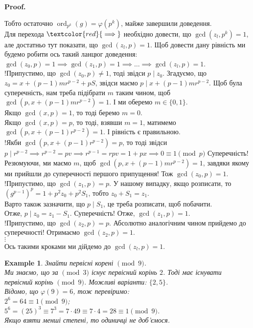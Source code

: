 \documentclass[a4paper, 14pt]{extarticle}
\makeatletter
\theoremstyle{theoremdd}
\theoremstyle{theoremdd}
\theoremstyle{theoremdd}
\theoremstyle{theoremdd}
\newtheorem{example}[theorem]{Example}
\theoremstyle{theoremdd}
\theoremstyle{theoremdd}
\theoremstyle{theoremdd}
\theoremstyle{theoremdd}
\def\qed{$\blacksquare$}
\renewenvironment{proof}[1][Proof.\\]{\par
\pushQED{\hfill \qed}%
\normalfont \topsep6\p@\@plus6\p@\relax
\trivlist
\item\relax
{\bfseries
#1\@addpunct{.}}\hspace\labelsep\ignorespaces
}{%
\popQED\endtrivlist\@endpefalse
}
\DeclareMathOperator{\ord}{ord}
\makeatother
\begin{document}
\begin{proof}
Тобто остаточно $\ord_{p^k} (g) = \varphi(p^k)$, майже завершили доведення.
\bigskip \\
Для перехода $\textcolor{red}{\implies}$ необхідно довести, що $\gcd(z_l,p^k) = 1$, але достатньо тут показати, що $\gcd(z_l,p) = 1$. Щоб довести дану рівність ми будемо робити ось такий ланцюг доведення:\\
$\gcd(z_0,p) = 1 \implies \gcd(z_1,p) = 1 \implies \dots \implies \gcd(z_l,p)=1$.\\
!Припустимо, що $\gcd(z_0,p) \neq 1$, тоді звідси $p \mid z_0$. Згадуємо, що\\
$z_0 = x + (p-1)mr^{p-2} + pS$, звідси маємо $p \mid x+(p-1)mr^{p-2}$. Щоб була суперечність, нам треба підібрати $m$ таким чином, щоб \\ $\gcd(p,x+(p-1)mr^{p-2}) = 1$. І ми оберемо $m \in \{0,1\}$.\\
Якщо $\gcd(x,p) = 1$, то тоді беремо $m = 0$.\\
Якщо $\gcd(x,p) = p$, то тоді, взявши $m =1$, матимемо \\ $\gcd(p,x+(p-1)r^{p-2}) = 1$. І рівність є правильною. \\
!Якби $\gcd(p,x+(p-1)r^{p-2}) = p$, то тоді звідси $p \mid r^{p-2} \implies r^{p-2} = pv \implies r^{p-1} = rpv = 1 + px \implies 0 \equiv 1 \pmod p$ Суперечність!\\
Резюмуючи, ми маємо $m$, щоб $\gcd(p,x+(p-1)mr^{p-2}) = 1$, завдяки якому ми прийшли до суперечності першого припущення! Тож $\gcd(z_0,p) = 1$.
\bigskip \\
!Припустимо, що $\gcd(z_1,p) = p$. У нашому випадку, якщо розписати, то\\
$(g^{p-1})^p = 1 + p^2 z_0 + p^2 S_1$, тобто $z_0 + S_1 = z_1$.\\
Варто також зазначити, що $p \mid S_1$, це треба розписати, щоб побачити.\\
Отже, $p \mid z_0 = z_1 - S_1$. Суперечність! Отже, $\gcd(z_1,p) = 1$.\\
!Припустимо, що $\gcd(z_2,p) = p$. Абсолютно аналогічним чином прийдемо до суперечності! Отримаємо $\gcd(z_2,p) = 1$.\\
$\vdots$\\
Ось такими кроками ми дійдемо до $\gcd(z_l,p) = 1$.
\end{proof}

\begin{example}
Знайти первісні корені $\!\! \pmod 9$.\\
Ми знаємо, що за $\!\! \pmod 3$ існує первісний корінь $2$. Тоді має існувати первісний корінь $\!\! \pmod 9$. Можливі варіанти: $\{2,5\}$.\\
Відомо, що $\varphi(9) = 6$, тож перевіримо:\\
$2^6 = 64 \equiv 1 \pmod 9$;\\
$5^6 = (25)^3 \equiv 7^3 = 7 \cdot 49 \equiv 7 \cdot 4 = 28 \equiv 1 \pmod 9$.\\
Якщо взяти менші степені, то одиничці не доб'ємося.
\end{example}
\end{document}
